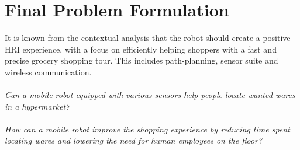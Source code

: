 \chapter{Final Problem Formulation}\label{ch:final}

It is known from the contextual analysis that the robot should create a positive HRI experience, with a focus on efficiently helping shoppers with a fast and precise grocery shopping tour. This includes path-planning, sensor suite and wireless communication.\\
\\
\textit{Can a mobile robot equipped with various sensors help people locate wanted wares in a hypermarket?}\\
\\
\textit{How can a mobile robot improve the shopping experience by reducing time spent locating wares and lowering the need for human employees on the floor?}



